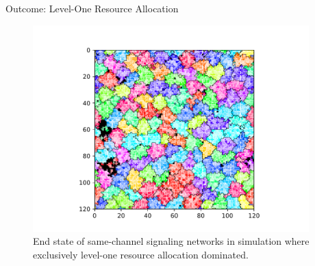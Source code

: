 \begin{frame}{Outcome: Level-One Resource Allocation}
\begin{figure}
\begin{columns}
\begin{column}{0.6\textwidth}
\includegraphics[width=\textwidth]{img/results/ChannelMap_1003_update24995104}
\end{column}
\begin{column}{0.4\textwidth}
\caption{
End state of same-channel signaling networks in simulation where exclusively level-one resource allocation dominated.
}
\end{column}
\end{columns}
\end{figure}
\end{frame}

